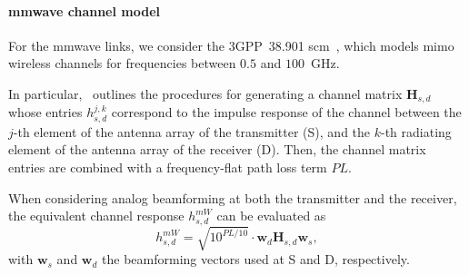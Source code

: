 \paragraph{\gls{mmwave} channel model}

For the \gls{mmwave} links, we consider the 3GPP~38.901 \gls{scm}~\cite{3gpp.38.901}, which models \gls{mimo} wireless channels for frequencies between $0.5$ and $100$~GHz. %

In particular,~\cite{3gpp.38.901} outlines the procedures for generating a channel matrix $\bm{H}_{s, d}$ whose entries $h_{s, d}^{j, k}$ correspond to the impulse response of the channel between the $j$-th element of the antenna array of the transmitter (S), and the $k$-th radiating element of the antenna array of the receiver (D). %
Then, the channel matrix entries are combined with a frequency-flat path loss term $PL$. 

When considering analog beamforming at both the transmitter and the receiver, the equivalent channel response $h_{s, d}^{mW}$ can be evaluated as
\begin{equation}
\label{eq:sinr}
    h_{s, d}^{mW} = \sqrt{10^{PL/10}} \cdot \bm{w}_{d} \bm{H}_{s, d} \bm{w}_{s},
\end{equation}
%
with $\bm{w}_{s}$ and $\bm{w}_{d}$ the beamforming vectors used at S and D, respectively.

